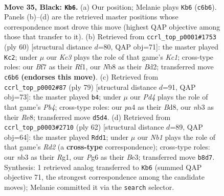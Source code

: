 \documentclass[11pt]{article}
\begin{document}
\begin{figure}[p]\centering
\begin{subfigure}{0.46\textwidth}\centering
\resizebox{\linewidth}{!}{%
\newchessgame
\chessboard[
  setfen={rn1b2r1/1p3b1p/2k3pP/p2pPp2/P7/1NN3P1/1B4K1/R4R2 b - - 14 35},
  showmover=false,
  pgfstyle=straightmove, color=movearrow, markmove={c6-b6}
]}
\caption{}
\end{subfigure}\hfill
\begin{subfigure}{0.46\textwidth}\centering
\resizebox{\linewidth}{!}{%
\newchessgame
\chessboard[
  setfen={2r4b/2r1pk1p/3pp2P/NB2n3/P3P1Pp/1PP2P2/3B4/2K2R2 w - - 1 31},
  showmover=false,
  pgfstyle=straightmove, color=movearrow, markmove={c1-c2}
]}
\caption{}
\end{subfigure}
\\[4pt]
\begin{subfigure}{0.46\textwidth}\centering
\resizebox{\linewidth}{!}{%
\newchessgame
\chessboard[
  setfen={3br1n1/2p2r2/2k5/1pp1Pp2/7p/2N4P/1PP3PB/R4R1K b - - 1 40},
  showmover=false,
  pgfstyle=straightmove, color=movearrow, markmove={b5-b4}
]}
\caption{}
\end{subfigure}\hfill
\begin{subfigure}{0.46\textwidth}\centering
\resizebox{\linewidth}{!}{%
\newchessgame
\chessboard[
  setfen={2rr4/4bk2/4p1p1/1p6/1n1PP3/p3B3/P2RKP2/1B4R1 w - - 2 32},
  showmover=false,
  pgfstyle=straightmove, color=movearrow, markmove={d2-d1}
]}
\caption{}
\end{subfigure}
\caption{\textbf{Move 35, Black: \texttt{Kb6}.} (a) Our position; Melanie plays \texttt{Kb6} (\texttt{c6b6}). Panels (b)--(d) are the retrieved master positions whose correspondence most drove this move (highest QAP objective among those that transfer to it). (b) Retrieved from \texttt{ccrl\_top\_p0001\#1753} (ply 60) [structural distance $d$=80, QAP obj=71]: the master played \texttt{Kc2}; under $\mu$ our \emph{Kc3} plays the role of that game's \emph{Kc1}; cross-type roles: our \emph{B}f7 as their \emph{R}f1, our \emph{N}b8 as their \emph{B}d2; transferred move \texttt{c6b6} \textbf{(endorses this move)}. (c) Retrieved from \texttt{ccrl\_top\_p0002\#87} (ply 79) [structural distance $d$=91, QAP obj=73]: the master played \texttt{b4}; under $\mu$ our \emph{Pd4} plays the role of that game's \emph{Pb4}; cross-type roles: our \emph{p}a4 as their \emph{B}d8, our \emph{n}b3 as their \emph{R}e8; transferred move \texttt{d5d4}. (d) Retrieved from \texttt{ccrl\_top\_p0003\#2710} (ply 62) [structural distance $d$=89, QAP obj=64]: the master played \texttt{Rdd1}; under $\mu$ our \emph{Nb1} plays the role of that game's \emph{Rd2} (a \textbf{cross-type} correspondence); cross-type roles: our \emph{n}b3 as their \emph{R}g1, our \emph{P}g6 as their \emph{B}e3; transferred move \texttt{b8d7}. Synthesis: 1 retrieved analog transferred to \texttt{Kb6} (summed QAP objective 71, the strongest correspondence among the candidate moves); Melanie committed it via the \texttt{search} selector.}
\label{fig:thought-m69}
\end{figure}
\end{document}
